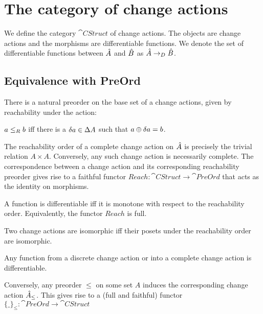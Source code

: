 \section{The category of change actions}
\label{sec:category}

\begin{defn}
  We define the category $\cat{CStruct}$ of change actions. The objects are
  change actions and the morphisms are differentiable functions. We denote
  the set of differentiable functions between $\hat{A}$ and $\hat{B}$ as $\hat{A} \rightarrow_{D} \hat{B}$.
\end{defn}

\subsection{Equivalence with PreOrd}

There is a natural preorder on the base set of a change actions, given by reachability
 under the action:
\begin{defn}
  $a \leq_R b$ iff there is a $\delta a \in \Delta A$ such that $a \oplus
  \delta a = b$.
\end{defn}

The reachability order of a complete change action on $\hat{A}$ is precisely the trivial relation
$A \times A$. Conversely, any such change action is necessarily complete. The correspondence
between a change action and its corresponding reachability preorder gives rise to
a faithful functor $Reach : \cat{CStruct} \rightarrow \cat{PreOrd}$ that acts as the identity
on morphisms.

\begin{prop}
  A function is differentiable iff it is monotone with respect to the
  reachability order. Equivalently, the functor $Reach$ is full.
\end{prop}

\begin{corollary}
  Two change actions are isomorphic iff their posets under the reachability
  order are isomorphic.
\end{corollary}

\begin{corollary}
  Any function from a discrete change action or into a complete change
  action is differentiable.
\end{corollary}

Conversely, any preorder $\leq$ on some set $A$ induces the corresponding change action
$\hat{A}_\leq$. This gives rise to a (full and faithful) functor $\{\_\}_\leq : \cat{PreOrd} \rightarrow \cat{CStruct}$

